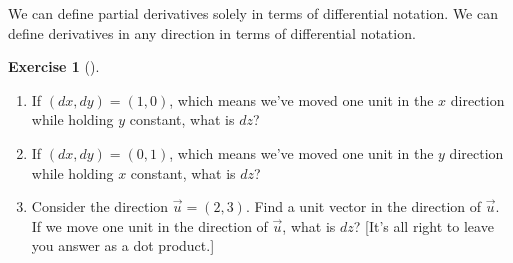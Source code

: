 \documentclass[10pt,]{book}
\theoremstyle{plain}
\theoremstyle{definition}
\theoremstyle{definition}
\theoremstyle{definition}
\theoremstyle{definition}
\newtheorem{exploration}[project]{Exercise}
\theoremstyle{definition}
\numberwithin{equation}{section}
\begin{document}
We can define partial derivatives solely in terms of differential notation. We can define derivatives in any direction in terms of differential notation.%
\begin{exploration}[]\label{exploration-226}
\leavevmode%
\begin{enumerate}[font=\bfseries,label=(\alph*),ref=\alph*]
\item\label{task-602} If \((dx,dy)=(1,0)\), which means we've moved one unit in the \(x\) direction while holding \(y\) constant, what is \(dz\)?%
\item\label{task-603} If \((dx,dy)=(0,1)\), which means we've moved one unit in the \(y\) direction while holding \(x\) constant, what is \(dz\)?%
\item\label{task-604} Consider the direction \(\vec u=(2,3)\).  Find a unit vector in the direction of \(\vec u\).  If we move one unit in the direction of \(\vec u\), what is \(dz\)? [It's all right to leave you answer as a dot product.]%
\end{enumerate}
\end{exploration}
\typeout{************************************************}
\typeout{************************************************}
\end{document}
